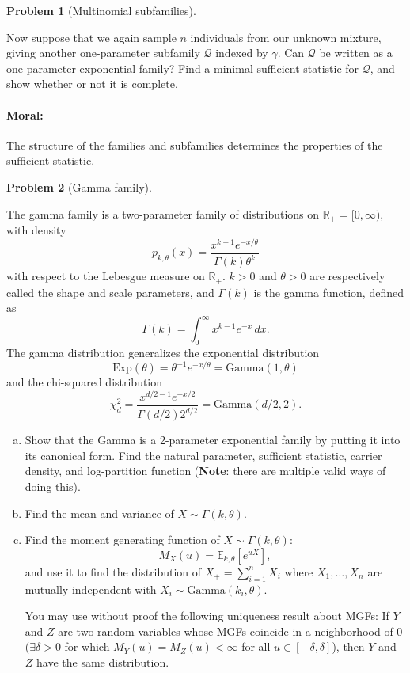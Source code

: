\documentclass{article}
\newcommand{\cQ}{\mathcal{Q}}
\newcommand{\EE}{\mathbb{E}}
\newcommand{\RR}{\mathbb{R}}
\theoremstyle{definition}
\newtheorem{problem}{Problem}
\begin{document}
\begin{problem}[Multinomial subfamilies]
\begin{enumerate}[(a)]
    Now suppose that we again sample $n$ individuals from our unknown mixture, giving another one-parameter subfamily $\cQ$ indexed by $\gamma$. Can $\cQ$ be written as a one-parameter exponential family? Find a minimal sufficient statistic for $\cQ$, and show whether or not it is complete.

  

  \end{enumerate}

  \paragraph{Moral:} The structure of the families and subfamilies determines the properties of the sufficient statistic.

\end{problem}


\begin{problem}[Gamma family]
\label{prob:gamma-family}

The gamma family is a two-parameter family of distributions on $\RR_+ = [0,\infty)$, with density
\[
p_{k,\theta}(x) = \frac{x^{k-1}e^{-x/\theta}}{\Gamma(k)\theta^k}
\]
with respect to the Lebesgue measure on $\RR_+$. $k>0$ and $\theta>0$ are respectively called the shape and scale parameters, and $\Gamma(k)$ is the gamma function, defined as
\[
\Gamma(k) = \int_0^\infty x^{k-1}e^{-x}\,d x.
\]
The gamma distribution generalizes the exponential distribution 
\[
\text{Exp}(\theta) = \theta^{-1}e^{-x/\theta} = \text{Gamma}(1,\theta)
\]
and the chi-squared distribution 
\[
\chi_d^2 = \frac{x^{d/2-1}e^{-x/2}}{\Gamma(d/2)2^{d/2}} = \text{Gamma}(d/2,2).
\]



\begin{enumerate}[(a)]
\item Show that the Gamma is a 2-parameter exponential family by putting it into its canonical form. Find the natural parameter, sufficient statistic, carrier density, and log-partition function ({\bf Note}: there are multiple valid ways of doing this).

  

\item Find the mean and variance of $X \sim \Gamma(k,\theta)$.

  

\item Find the moment generating function of $X\sim \Gamma(k,\theta)$:
\[
M_X(u) = \EE_{k,\theta}[e^{uX}],
\]
and use it to find the distribution of $X_+ = \sum_{i=1}^n X_i$ where $X_1,\ldots,X_n$ are mutually independent with $X_i \sim \text{Gamma}(k_i, \theta)$.

You may use without proof the following uniqueness result about MGFs:
If $Y$ and $Z$ are two random variables whose MGFs coincide in a neighborhood of 0 ($\exists \delta>0$ for which $M_Y(u) =M_Z(u) < \infty$ for all $u\in[-\delta,\delta]$), then $Y$ and $Z$ have the same distribution.


\end{enumerate}
\end{problem}
\end{document}
